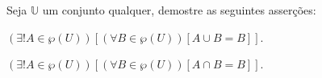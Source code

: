 \begin{problem}\label{prob:Demosntracoes15}
	Seja $\mathbb{U}$ um conjunto qualquer, demostre as seguintes asserções:
\end{problem}

\begin{exerList}
	\item $(\exists! A \in \wp(U))[(\forall B \in \wp(U))[A \cup B = B]]$.
	\item $(\exists! A \in \wp(U))[(\forall B \in \wp(U))[A \cap B = B]]$.
\end{exerList}